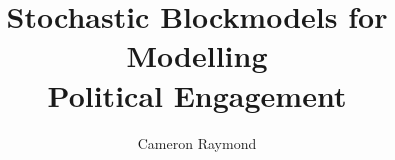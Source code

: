

%





\title{Stochastic Blockmodels for Modelling \\[1ex]Political Engagement}

\author{Cameron Raymond}


\figurespagefalse
\tablespagefalse

\beforepreface



